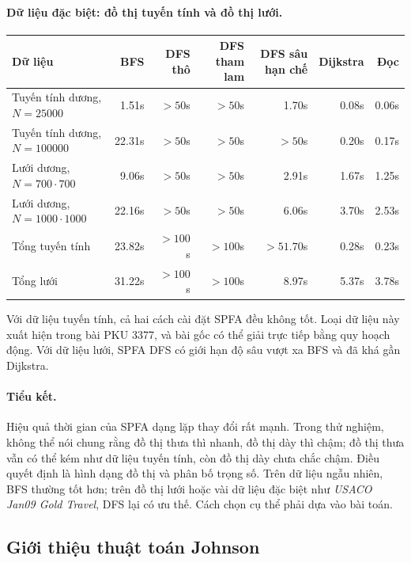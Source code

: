 \documentclass[11pt]{article}
\begin{document}
\paragraph{Dữ liệu đặc biệt: đồ thị tuyến tính và đồ thị lưới.}
\begin{center}
\small
\begin{tabular}{|l|r|r|r|r|r|r|}
\hline
Dữ liệu & BFS & DFS thô & DFS tham lam & DFS sâu hạn chế & Dijkstra & Đọc \\
\hline
Tuyến tính dương, \(N=25000\) & 1.51s & \(>50\)s & \(>50\)s & 1.70s & 0.08s & 0.06s \\
Tuyến tính dương, \(N=100000\) & 22.31s & \(>50\)s & \(>50\)s & \(>50\)s & 0.20s & 0.17s \\
Lưới dương, \(N=700\cdot700\) & 9.06s & \(>50\)s & \(>50\)s & 2.91s & 1.67s & 1.25s \\
Lưới dương, \(N=1000\cdot1000\) & 22.16s & \(>50\)s & \(>50\)s & 6.06s & 3.70s & 2.53s \\
Tổng tuyến tính & 23.82s & \(>100\)s & \(>100\)s & \(>51.70\)s & 0.28s & 0.23s \\
Tổng lưới & 31.22s & \(>100\)s & \(>100\)s & 8.97s & 5.37s & 3.78s \\
\hline
\end{tabular}
\end{center}

Với dữ liệu tuyến tính, cả hai cách cài đặt SPFA đều không tốt. Loại dữ liệu
này xuất hiện trong bài PKU 3377, và bài gốc có thể giải trực tiếp bằng quy
hoạch động. Với dữ liệu lưới, SPFA DFS có giới hạn độ sâu vượt xa BFS và đã
khá gần Dijkstra.

\paragraph{Tiểu kết.}
Hiệu quả thời gian của SPFA dạng lặp thay đổi rất mạnh. Trong thử nghiệm,
không thể nói chung rằng đồ thị thưa thì nhanh, đồ thị dày thì chậm; đồ thị
thưa vẫn có thể kém như dữ liệu tuyến tính, còn đồ thị dày chưa chắc chậm.
Điều quyết định là hình dạng đồ thị và phân bố trọng số. Trên dữ liệu ngẫu
nhiên, BFS thường tốt hơn; trên đồ thị lưới hoặc vài dữ liệu đặc biệt như
\textit{USACO Jan09 Gold Travel}, DFS lại có ưu thế. Cách chọn cụ thể phải
dựa vào bài toán.

\subsection{Giới thiệu thuật toán Johnson}
\end{document}
